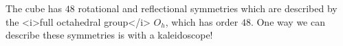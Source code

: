 The cube has \(48\) rotational and reflectional symmetries which are described by the <i>full octahedral group</i> \(O_h\), which has order \(48\). One way we can describe these symmetries is with a kaleidoscope!
